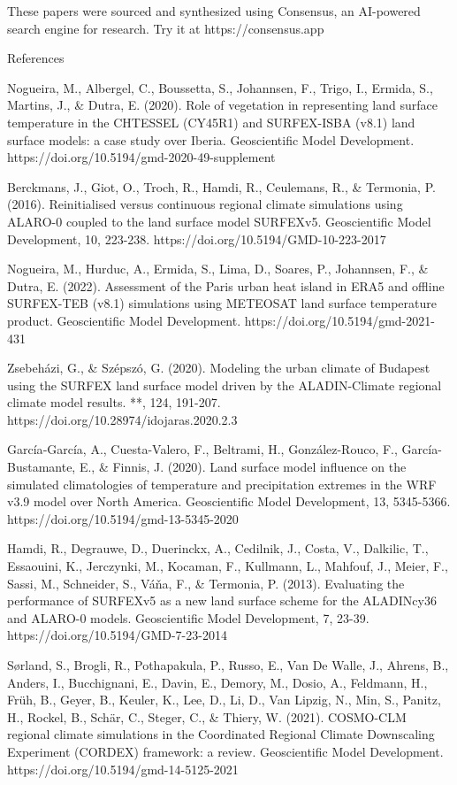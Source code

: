 These papers were sourced and synthesized using Consensus, an AI-powered search engine for research. Try it at https://consensus.app

References

Nogueira, M., Albergel, C., Boussetta, S., Johannsen, F., Trigo, I., Ermida, S., Martins, J., & Dutra, E. (2020). Role of vegetation in representing land surface temperature in the CHTESSEL (CY45R1) and SURFEX-ISBA (v8.1) land surface models: a case study over Iberia. Geoscientific Model Development. https://doi.org/10.5194/gmd-2020-49-supplement

Berckmans, J., Giot, O., Troch, R., Hamdi, R., Ceulemans, R., & Termonia, P. (2016). Reinitialised versus continuous regional climate simulations using ALARO-0 coupled to the land surface model SURFEXv5. Geoscientific Model Development, 10, 223-238. https://doi.org/10.5194/GMD-10-223-2017

Nogueira, M., Hurduc, A., Ermida, S., Lima, D., Soares, P., Johannsen, F., & Dutra, E. (2022). Assessment of the Paris urban heat island in ERA5 and offline SURFEX-TEB (v8.1) simulations using METEOSAT land surface temperature product. Geoscientific Model Development. https://doi.org/10.5194/gmd-2021-431

Zsebeházi, G., & Szépszó, G. (2020). Modeling the urban climate of Budapest using the SURFEX land surface model driven by the ALADIN-Climate regional climate model results. **, 124, 191-207. https://doi.org/10.28974/idojaras.2020.2.3

García‐García, A., Cuesta-Valero, F., Beltrami, H., González-Rouco, F., García-Bustamante, E., & Finnis, J. (2020). Land surface model influence on the simulated climatologies of temperature and precipitation extremes in the WRF v3.9 model over North America. Geoscientific Model Development, 13, 5345-5366. https://doi.org/10.5194/gmd-13-5345-2020

Hamdi, R., Degrauwe, D., Duerinckx, A., Cedilnik, J., Costa, V., Dalkilic, T., Essaouini, K., Jerczynki, M., Kocaman, F., Kullmann, L., Mahfouf, J., Meier, F., Sassi, M., Schneider, S., Váňa, F., & Termonia, P. (2013). Evaluating the performance of SURFEXv5 as a new land surface scheme for the ALADINcy36 and ALARO-0 models. Geoscientific Model Development, 7, 23-39. https://doi.org/10.5194/GMD-7-23-2014

Sørland, S., Brogli, R., Pothapakula, P., Russo, E., Van De Walle, J., Ahrens, B., Anders, I., Bucchignani, E., Davin, E., Demory, M., Dosio, A., Feldmann, H., Früh, B., Geyer, B., Keuler, K., Lee, D., Li, D., Van Lipzig, N., Min, S., Panitz, H., Rockel, B., Schär, C., Steger, C., & Thiery, W. (2021). COSMO-CLM regional climate simulations in the Coordinated Regional Climate Downscaling Experiment (CORDEX) framework: a review. Geoscientific Model Development. https://doi.org/10.5194/gmd-14-5125-2021